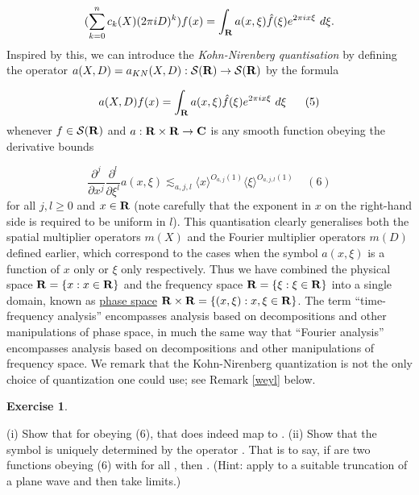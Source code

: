 \documentclass[11pt]{article}
\theoremstyle{definition}
\newtheorem{exercise}[theorem]{Exercise}
\theoremstyle{remark}
\begin{document}
\[\displaystyle (\sum_{k=0}^n c_k(X) (2\pi i D)^k) f(x) = \int_{\bf R} a(x,\xi) \hat f(\xi) e^{2\pi i x \xi}\ d\xi.\]
 Inspired by this, we can introduce the \emph{Kohn-Nirenberg quantisation} by defining the operator \({a(X,D) = a_{KN}(X,D): {\mathcal S}({\bf R}) \rightarrow {\mathcal S}({\bf R})}\) by the formula \label{axd}

\[\displaystyle  a(X,D) f(x) = \int_{\bf R} a(x,\xi) \hat f(\xi) e^{2\pi i x \xi}\ d\xi \ \ \ \ \ (5)\]
 whenever \({f \in {\mathcal S}({\bf R})}\) and \({a: {\bf R} \times {\bf R} \rightarrow {\bf C}}\) is any smooth function obeying the derivative bounds \label{deriv-2}

\[\displaystyle  \frac{\partial^j}{\partial x^j} \frac{\partial^l}{\partial \xi^l} a(x,\xi) \lesssim_{a,j,l} \langle x \rangle^{O_{a,j}(1)} \langle \xi \rangle^{O_{a,j,l}(1)} \ \ \ \ \ (6)\]
 for all \({j,l \geq 0}\) and \({x \in {\bf R}}\) (note carefully that the exponent in \({x}\) on the right-hand side is required to be uniform in \({l}\)). This quantisation clearly generalises both the spatial multiplier operators \({m(X)}\) and the Fourier multiplier operators \({m(D)}\) defined earlier, which correspond to the cases when the symbol \({a(x,\xi)}\) is a function of \({x}\) only or \({\xi}\) only respectively. Thus we have combined the physical space \({{\bf R} = \{ x: x \in {\bf R}\}}\) and the frequency space \({{\bf R} = \{ \xi: \xi \in {\bf R}\}}\) into a single domain, known as \href{https://en.wikipedia.org/wiki/Phase_space}{phase space} \({{\bf R} \times {\bf R} = \{ (x,\xi): x,\xi \in {\bf R} \}}\). The term “time-frequency analysis” encompasses analysis based on decompositions and other manipulations of phase space, in much the same way that “Fourier analysis” encompasses analysis based on decompositions and other manipulations of frequency space. We remark that the Kohn-Nirenberg quantization is not the only choice of quantization one could use; see Remark \ref{weyl} below.

\begin{exercise}
 \label{unq} 


(i) Show that for  obeying (6), that  does indeed map  to . 
(ii) Show that the symbol  is uniquely determined by the operator . That is to say, if  are two functions obeying (6) with  for all , then . (Hint: apply  to a suitable truncation of a plane wave  and then take limits.)



\end{exercise}
\end{document}
